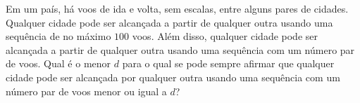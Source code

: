 Em um país, há voos de ida e volta, sem escalas, entre alguns pares de cidades. Qualquer cidade pode ser alcançada a partir de qualquer outra usando uma sequência de no máximo $100$ voos. Além disso, qualquer cidade pode ser alcançada a partir de qualquer outra usando uma sequência com um número par de voos. Qual é o menor $d$ para o qual se pode sempre afirmar que qualquer cidade pode ser alcançada por qualquer outra usando uma sequência com um número par de voos menor ou igual a $d$?
